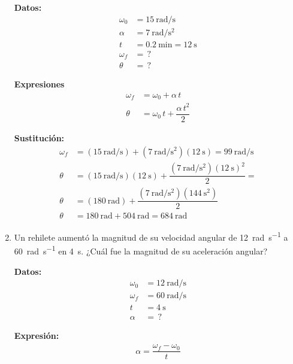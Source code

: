 \documentclass[14pt]{extarticle}
\begin{document}
\begin{enumerate}
\begin{minipage}[t]{0.4\linewidth}
\textbf{Datos:}
\begin{align*}
\omega_{0} &= \SI{15}{\radian\per\second} \\
\alpha &= \SI{7}{\radian\per\square\second} \\
t &= \SI{0.2}{\minute} = \SI{12}{\second} \\
\omega_{f} &= \, ? \\
\theta &= \, ?
\end{align*}
\end{minipage}
\begin{minipage}[t]{0.4\linewidth}
\textbf{Expresiones}
\begin{align*}
\omega_{f} &= \omega_{0} + \alpha \, t \\
\theta &= \omega_{0} \, t + \dfrac{\alpha \, t^{2}}{2}
\end{align*}
\end{minipage}

\textbf{Sustitución:}
\begin{align*}
\omega_{f} &= \left( \SI[per-mode=fraction]{15}{\radian\per\second} \right) + \left( \SI[per-mode=fraction]{7}{\radian\per\square\second} \right) \left(  \SI{12}{\second} \right) = \SI[per-mode=fraction]{99}{\radian\per\second} \\[0.5em]
\theta &= \left( \SI[per-mode=fraction]{15}{\radian\per\second} \right) \left(  \SI{12}{\second} \right) + \dfrac{\left( \displaystyle \SI[per-mode=fraction]{7}{\radian\per\square\second} \right) \left( \SI{12}{\second} \right)^{2}}{2} = \\[0.5em]
\theta &= \left( \SI{180}{\radian} \right) + \dfrac{\left( \displaystyle \SI[per-mode=fraction]{7}{\radian\per\square\second} \right) \left( \SI{144}{\square\second} \right)}{2} \\[0.5em]
\theta &= \SI{180}{\radian} + \SI{504}{\radian} = \SI{684}{\radian}
\end{align*}
\item Un rehilete aumentó la magnitud de su velocidad angular de \SI{12}{\radian\per\second} a \SI{60}{\radian\per\second} en \SI{4}{\second}. ¿Cuál fue la magnitud de su aceleración angular?

\begin{minipage}[t]{0.4\linewidth}
\textbf{Datos:}
\begin{align*}
\omega_{0} &= \SI{12}{\radian\per\second} \\
\omega_{f} &= \SI{60}{\radian\per\second} \\
t &= \SI{4}{\second} \\
\alpha &= \, ?
\end{align*}
\end{minipage}
\begin{minipage}[t]{0.4\linewidth}
\textbf{Expresión:}
\begin{align*}
\alpha = \dfrac{\omega_{f} - \omega_{0}}{t}
\end{align*}
\end{minipage}


\end{enumerate}
\end{document}
